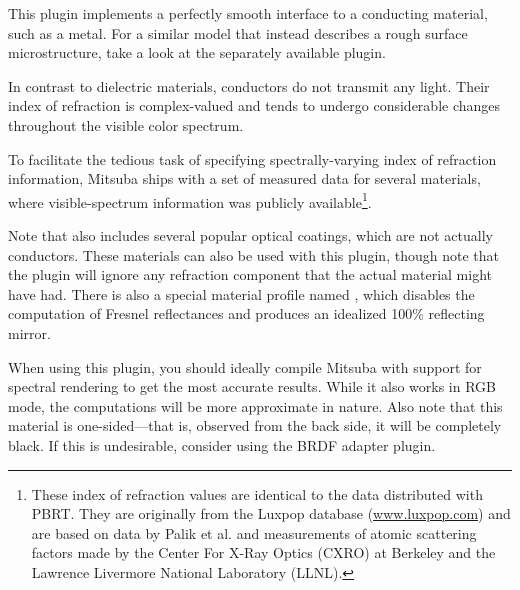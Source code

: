 This plugin implements a perfectly smooth interface to a conducting material,
such as a metal. For a similar model that instead describes a rough surface
microstructure, take a look at the separately available
 plugin.

In contrast to dielectric materials, conductors do not transmit
any light. Their index of refraction is complex-valued and tends to undergo
considerable changes throughout the visible color spectrum.

To facilitate the tedious task of specifying spectrally-varying index of
refraction information, Mitsuba ships with a set of measured data for
several materials, where visible-spectrum information was publicly
available\footnote{
  These index of refraction values are identical to the data distributed
  with PBRT. They are originally from the Luxpop database
  (\url{www.luxpop.com}) and are based on data by Palik et al.
  \cite{Palik1998Handbook} and measurements of atomic scattering factors
  made by the Center For X-Ray Optics (CXRO) at Berkeley and the
  Lawrence Livermore National Laboratory (LLNL).
}.

Note that  also includes several popular optical
coatings, which are not actually conductors. These materials can also
be used with this plugin, though note that the plugin will ignore any
refraction component that the actual material might have had.
There is also a special material profile named , which disables
the computation of Fresnel reflectances and produces an idealized
100\% reflecting mirror.

When using this plugin, you should ideally compile Mitsuba with support for
spectral rendering to get the most accurate results. While it also works
in RGB mode, the computations will be more approximate in nature.
Also note that this material is one-sided---that is, observed from the
back side, it will be completely black. If this is undesirable,
consider using the  BRDF adapter plugin.\vspace{4mm}


